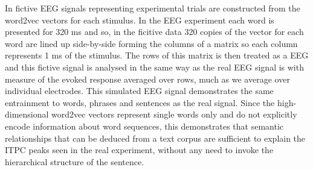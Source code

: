 \documentclass[10pt,letterpaper]{article}
\newcommand{\citet}[1]{\cite{#1}}
\begin{document}
In \citet{FrankYang2018} fictive EEG signals representing experimental
trials are constructed from the word2vec vectors for each stimulus. In
the EEG experiment each word is presented for 320 ms and so, in the
ficitive data 320 copies of the vector for each word are lined up
side-by-side forming the columns of a matrix so each column
represents 1 ms of the stimulus. The rows of this matrix is then
treated as a EEG and this fictive signal is analysed in the same way
as the real EEG signal is with measure of the evoked response averaged
over rows, much as we average over individual electrodes. This
simulated EEG signal demonstrates the same entrainment to words,
phrases and sentences as the real signal. Since the high-dimensional
word2vec vectors represent single words only and do not explicitly
encode information about word sequences, this demonstrates that
semantic relationships that can be deduced from a text corpus are
sufficient to explain the ITPC peaks seen in the real experiment, without
any need to invoke the hierarchical structure of the sentence.
\end{document}
